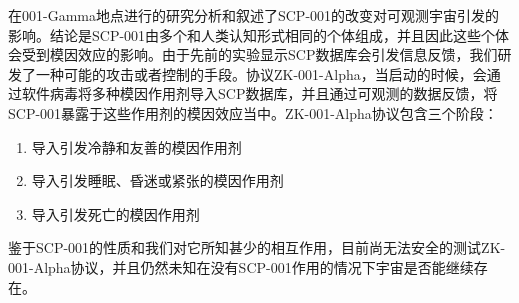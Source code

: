在001-Gamma地点进行的研究分析和叙述了SCP-001的改变对可观测宇宙引发的影响。结论是SCP-001由多个和人类认知形式相同的个体组成，并且因此这些个体会受到模因效应的影响。由于先前的实验显示SCP数据库会引发信息反馈，我们研发了一种可能的攻击或者控制的手段。协议ZK-001-Alpha，当启动的时候，会通过软件病毒将多种模因作用剂导入SCP数据库，并且通过可观测的数据反馈，将SCP-001暴露于这些作用剂的模因效应当中。ZK-001-Alpha协议包含三个阶段：

\begin{enumerate}
\item 导入引发冷静和友善的模因作用剂
\item 导入引发睡眠、昏迷或紧张的模因作用剂
\item 导入引发死亡的模因作用剂
\end{enumerate}

鉴于SCP-001的性质和我们对它所知甚少的相互作用，目前尚无法安全的测试ZK-001-Alpha协议，并且仍然未知在没有SCP-001作用的情况下宇宙是否能继续存在。
